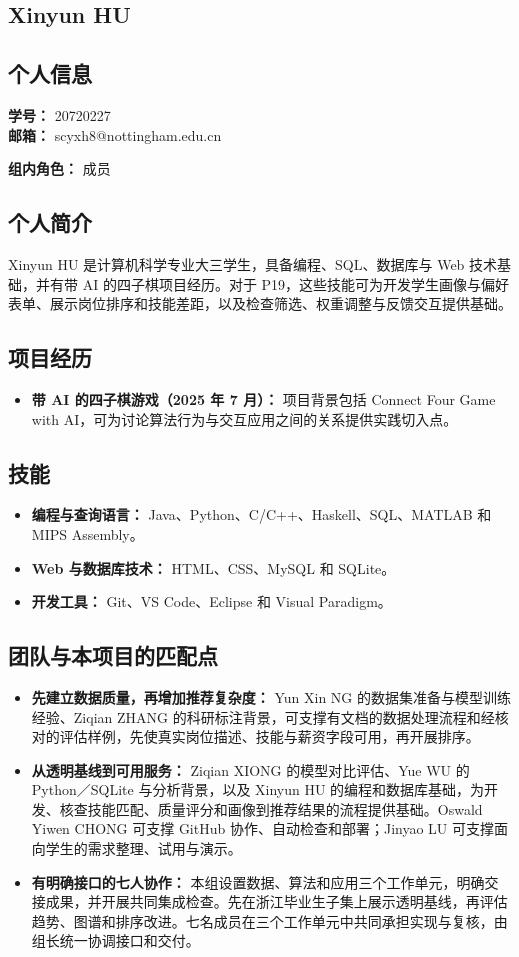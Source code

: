 \documentclass[a4paper,12pt]{article}
\newcommand{\PersonalInformation}[2]{%
  \subsection*{个人信息}
  \if\relax\detokenize{#1}\relax\else
  \noindent\textbf{学号：} #1\\
  \fi
  \textbf{邮箱：} #2\par
}
\begin{document}
\subsection{Xinyun HU}
\PersonalInformation{20720227}{scyxh8@nottingham.edu.cn}
\noindent\textbf{组内角色：} 成员\par

\subsection*{个人简介}
Xinyun HU 是计算机科学专业大三学生，具备编程、SQL、数据库与 Web 技术基础，并有带 AI 的四子棋项目经历。对于 P19，这些技能可为开发学生画像与偏好表单、展示岗位排序和技能差距，以及检查筛选、权重调整与反馈交互提供基础。

\subsection*{项目经历}
\begin{itemize}
  \item \textbf{带 AI 的四子棋游戏（2025 年 7 月）：} 项目背景包括 Connect Four Game with AI，可为讨论算法行为与交互应用之间的关系提供实践切入点。
\end{itemize}

\subsection*{技能}
\begin{itemize}
  \item \textbf{编程与查询语言：} Java、Python、C/C++、Haskell、SQL、MATLAB 和 MIPS Assembly。
  \item \textbf{Web 与数据库技术：} HTML、CSS、MySQL 和 SQLite。
  \item \textbf{开发工具：} Git、VS Code、Eclipse 和 Visual Paradigm。
\end{itemize}

\subsection{团队与本项目的匹配点}
\begin{itemize}
  \item \textbf{先建立数据质量，再增加推荐复杂度：} Yun Xin NG 的数据集准备与模型训练经验、Ziqian ZHANG 的科研标注背景，可支撑有文档的数据处理流程和经核对的评估样例，先使真实岗位描述、技能与薪资字段可用，再开展排序。
  \item \textbf{从透明基线到可用服务：} Ziqian XIONG 的模型对比评估、Yue WU 的 Python／SQLite 与分析背景，以及 Xinyun HU 的编程和数据库基础，为开发、核查技能匹配、质量评分和画像到推荐结果的流程提供基础。Oswald Yiwen CHONG 可支撑 GitHub 协作、自动检查和部署；Jinyao LU 可支撑面向学生的需求整理、试用与演示。
  \item \textbf{有明确接口的七人协作：} 本组设置数据、算法和应用三个工作单元，明确交接成果，并开展共同集成检查。先在浙江毕业生子集上展示透明基线，再评估趋势、图谱和排序改进。七名成员在三个工作单元中共同承担实现与复核，由组长统一协调接口和交付。
\end{itemize}
\end{document}
